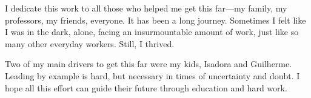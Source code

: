 \begin{dedicatoria}
   \vspace*{\fill}
I dedicate this work to all those who helped me get this far---my family, my professors, my friends, everyone. It has been a long journey. Sometimes I felt like I was in the dark, alone, facing an insurmountable amount of work, just like so many other everyday workers. Still, I thrived.

Two of my main drivers to get this far were my kids, Isadora and Guilherme. Leading by example is hard, but necessary in times of uncertainty and doubt. I hope all this effort can guide their future through education and hard work.
\end{dedicatoria}
